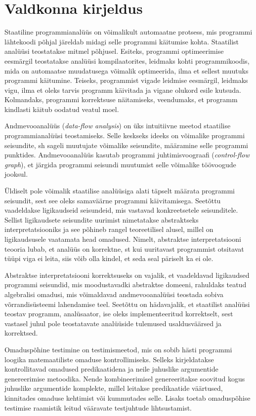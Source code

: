 \documentclass[thesis.tex]{subfiles}
\begin{document}
\section*{Valdkonna kirjeldus}

Staatiline programmianalüüs on võimalikult automaatne protsess, mis programmi lähtekoodi põhjal järeldab midagi selle programmi käitumise kohta. Staatilist analüüsi teostatakse mitmel põhjusel. Esiteks, programmi optimeerimise eesmärgil teostatakse analüüsi kompilaatorites, leidmaks kohti programmikoodis, mida on automaatse muudatusega võimalik optimeerida, ilma et sellest muutuks programmi käitumine. Teiseks, programmist vigade leidmise eesmärgil, leidmaks vigu, ilma et oleks tarvis programm käivitada ja vigane olukord esile kutsuda. Kolmandaks, programmi korrektsuse näitamiseks, veendumaks, et programm kindlasti käitub oodatud veatul moel.

Andmevooanalüüs (\emph{data-flow analysis}) on üks intuitiivne meetod staatilise programmianalüüsi teostamiseks. Selle keskseks ideeks on võimalike programmi seisundite, sh sageli muutujate võimalike seisundite, määramine selle programmi punktides. Andmevooanalüüs kasutab programmi juhtimisvoograafi (\emph{control-flow graph}), et järgida programmi seisundi muutumist selle võimalike töövoogude jooksul.

Üldiselt pole võimalik staatilise analüüsiga alati täpselt määrata programmi seisundit, sest see oleks samaväärne programmi käivitamisega. Seetõttu vaadeldakse ligikaudseid seisundeid, mis vastavad konkreetsetele seisunditele. Sellist ligikaudsete seisundite uurimist nimetatakse abstraktseks interpretatsiooniks ja see põhineb rangel teoreetilisel alusel, millel on ligikaudsusele vaatamata head omadused. Nimelt, abstraktse interpretatsiooni teooria lubab, et analüüs on korrektne, st kui uuritavast programmist otsitavat tüüpi viga ei leita, siis võib olla kindel, et seda seal päriselt ka ei ole.

Abstraktse interpretatsiooni korrektsuseks on vajalik, et vaadeldavad ligikaudsed programmi seisundid, mis moodustavadki abstraktse domeeni, rahuldaks teatud algebralisi omadusi, mis võimaldavad andmevooanalüüsi teostada sobiva võrrandisüsteemi lahendamise teel. Seetõttu on hädavajalik, et staatilist analüüsi teostav programm, analüsaator, ise oleks implementeeritud korrektselt, sest vastasel juhul pole teostatavate analüüside tulemused usaldusväärsed ja korrektsed.

Omaduspõhine testimine on testimismeetod, mis on sobib hästi programmi loogika matemaatiliste omaduse kontrollimiseks. Selleks kirjeldatakse kontrollitavad omadused predikaatidena ja neile juhuslike argumentide genereerimise metoodika. Nende kombineerimisel genereeritakse soovitud kogus juhuslike argumentide komplekte, millel leitakse predikaatide väärtused, kinnitades omaduse kehtimist või kummutades selle. Lisaks toetab omaduspõhise testimise raamistik leitud vääravate testjuhtude lihtsustamist.
\end{document}
